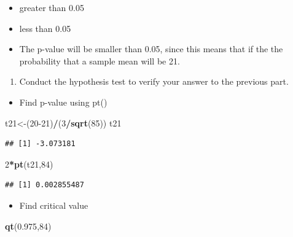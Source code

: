\documentclass[
  openany]{book}
\newenvironment{Shaded}{\begin{snugshade}}{\end{snugshade}}
\newcommand{\DecValTok}[1]{\textcolor[rgb]{0.00,0.00,0.81}{#1}}
\newcommand{\FloatTok}[1]{\textcolor[rgb]{0.00,0.00,0.81}{#1}}
\newcommand{\FunctionTok}[1]{\textcolor[rgb]{0.13,0.29,0.53}{\textbf{#1}}}
\newcommand{\NormalTok}[1]{#1}
\newcommand{\OtherTok}[1]{\textcolor[rgb]{0.56,0.35,0.01}{#1}}
\newcommand{\SpecialCharTok}[1]{\textcolor[rgb]{0.81,0.36,0.00}{\textbf{#1}}}
\providecommand{\tightlist}{%
  \setlength{\itemsep}{0pt}\setlength{\parskip}{0pt}}
\begin{document}
\begin{itemize}
\item
  greater than 0.05
\item
  less than 0.05
\item
  The p-value will be smaller than 0.05, since this means that if the the probability that a sample mean will be 21.
\end{itemize}

\begin{enumerate}
\def\labelenumi{\alph{enumi}.}
\setcounter{enumi}{3}
\tightlist
\item
  Conduct the hypothesis test to verify your answer to the previous part.
\end{enumerate}

\begin{itemize}
\tightlist
\item
  Find p-value using pt()
\end{itemize}

\begin{Shaded}
\begin{Highlighting}[]
\NormalTok{t21}\OtherTok{\textless{}{-}}\NormalTok{(}\DecValTok{20{-}21}\NormalTok{)}\SpecialCharTok{/}\NormalTok{(}\DecValTok{3}\SpecialCharTok{/}\FunctionTok{sqrt}\NormalTok{(}\DecValTok{85}\NormalTok{))}
\NormalTok{t21}
\end{Highlighting}
\end{Shaded}

\begin{verbatim}
## [1] -3.073181
\end{verbatim}

\begin{Shaded}
\begin{Highlighting}[]
\DecValTok{2}\SpecialCharTok{*}\FunctionTok{pt}\NormalTok{(t21,}\DecValTok{84}\NormalTok{)}
\end{Highlighting}
\end{Shaded}

\begin{verbatim}
## [1] 0.002855487
\end{verbatim}

\begin{itemize}
\tightlist
\item
  Find critical value
\end{itemize}

\begin{Shaded}
\begin{Highlighting}[]
\FunctionTok{qt}\NormalTok{(}\FloatTok{0.975}\NormalTok{,}\DecValTok{84}\NormalTok{)}
\end{Highlighting}
\end{Shaded}
\end{document}
